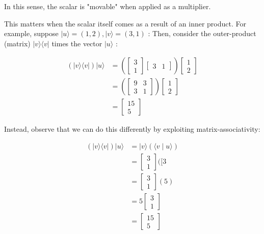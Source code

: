 \documentclass[main.tex]{subfiles}
\begin{document}
    In this sense, the scalar is "movable" when applied as a multiplier.
    
    This matters when the scalar itself comes as a result of an inner product. For example, suppose $|u\rangle=(1,2),|v\rangle=(3,1)$ : Then, consider the outer-product (matrix) $|v\rangle\langle v|$ times the vector $|u\rangle$ :
    
    $$
    \begin{aligned}
    (|v\rangle\langle v|)|u\rangle &=\left(\left[\begin{array}{l}
    3 \\
    1
    \end{array}\right]\left[\begin{array}{ll}
    3 & 1
    \end{array}\right]\right)\left[\begin{array}{l}
    1 \\
    2
    \end{array}\right] \\
    &=\left(\left[\begin{array}{ll}
    9 & 3 \\
    3 & 1
    \end{array}\right]\right)\left[\begin{array}{l}
    1 \\
    2
    \end{array}\right] \\
    &=\left[\begin{array}{r}
    15 \\
    5
    \end{array}\right]
    \end{aligned}
    $$
    
    Instead, observe that we can do this differently by exploiting matrix-associativity:
    
    $$
    \begin{aligned}
    (|v\rangle\langle v|)|u\rangle &=|v\rangle(\langle v \mid u\rangle) \\
    &=\left[\begin{array}{l}
    3 \\
    1
    \end{array}\right]([3\\
    &=\left[\begin{array}{l}
    3 \\
    1
    \end{array}\right](5) \\
    &=5\left[\begin{array}{l}
    3 \\
    1
    \end{array}\right] \\
    &=\left[\begin{array}{r}
    15 \\
    5
    \end{array}\right]
    \end{aligned}
    $$
    
\end{document}
